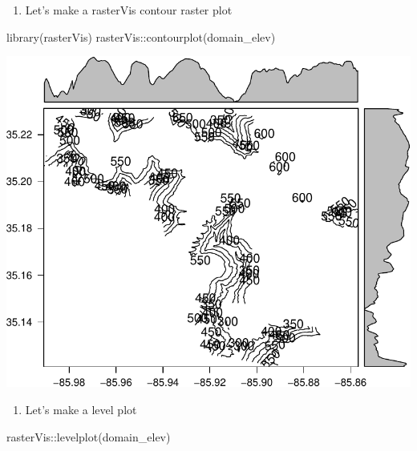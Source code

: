 \documentclass[
]{book}
\newenvironment{Shaded}{\begin{snugshade}}{\end{snugshade}}
\newcommand{\FunctionTok}[1]{\textcolor[rgb]{0.00,0.00,0.00}{#1}}
\newcommand{\NormalTok}[1]{#1}
\newcommand{\SpecialCharTok}[1]{\textcolor[rgb]{0.00,0.00,0.00}{#1}}
\providecommand{\tightlist}{%
  \setlength{\itemsep}{0pt}\setlength{\parskip}{0pt}}
\begin{document}
\begin{enumerate}
\def\labelenumi{\arabic{enumi}.}
\setcounter{enumi}{27}
\tightlist
\item
  Let's make a rasterVis contour raster plot
\end{enumerate}

\begin{Shaded}
\begin{Highlighting}[]
\FunctionTok{library}\NormalTok{(rasterVis)}
\NormalTok{rasterVis}\SpecialCharTok{::}\FunctionTok{contourplot}\NormalTok{(domain\_elev)}
\end{Highlighting}
\end{Shaded}

\includegraphics{figures/unnamed-chunk-436-1.pdf}

\begin{enumerate}
\def\labelenumi{\arabic{enumi}.}
\setcounter{enumi}{28}
\tightlist
\item
  Let's make a level plot
\end{enumerate}

\begin{Shaded}
\begin{Highlighting}[]
\NormalTok{rasterVis}\SpecialCharTok{::}\FunctionTok{levelplot}\NormalTok{(domain\_elev)}
\end{Highlighting}
\end{Shaded}
\end{document}
